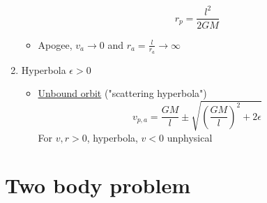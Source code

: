 \documentclass{article}
\newtheorem{one minute paper}[theorem]{One Minute Paper}
\begin{document}
\begin{enumerate}
\begin{itemize}
        \begin{equation}
            r_p = \frac{l^2}{2GM}
        \end{equation}
        \item Apogee, $v_a \rightarrow 0$ and $r_a = \frac{l}{r_a} \rightarrow \infty$
    \end{itemize}
    \item Hyperbola $\epsilon > 0$
    \begin{itemize}
        \item \underline{Unbound orbit} ("scattering hyperbola")
        \begin{equation}
            v_{p,a} = \frac{GM}{l} \pm \sqrt{(\frac{GM}{l})^2 + 2\epsilon}
        \end{equation}
        For $v,r>0$, hyperbola, $v<0$ unphysical
    \end{itemize}
\end{enumerate}

\section*{Two body problem}
\end{document}
